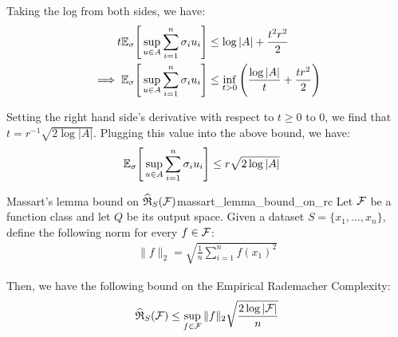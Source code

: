 \begin{proof*}
    \noindent Taking the log from both sides, we have:
    \begin{align*}
        t\mathbb{E}_\sigma\Bigg[ 
            \sup_{u\in A} \sum_{i=1}^n \sigma_i u_i
         \Bigg] &\le \log|A| + \frac{t^2r^2}{2} \\
        \implies \mathbb{E}_\sigma\Bigg[ 
            \sup_{u\in A} \sum_{i=1}^n \sigma_i u_i
         \Bigg] &\le \inf_{t>0} \Bigg( 
            \frac{\log|A|}{t} + \frac{tr^2}{2}
         \Bigg)
    \end{align*}

    \noindent Setting the right hand side's derivative with respect to $t\ge0$ to $0$, we find that $t = r^{-1}\sqrt{2\log|A|}$. Plugging this value into the above bound, we have:
    \begin{align*}
        \mathbb{E}_\sigma\Bigg[ 
            \sup_{u\in A} \sum_{i=1}^n \sigma_i u_i
         \Bigg] &\le r\sqrt{2\log|A|}
    \end{align*}
\end{proof*}

\begin{corollary}{Massart's lemma bound on $\widehat{\mathfrak{R}}_S(\mathcal{F})$}{massart_lemma_bound_on_rc}
    Let $\mathcal{F}$ be a function class and let $Q$ be its output space. Given a dataset $S=\{x_1, \dots, x_n\}$, define the following norm for every $f\in\mathcal{F}$:
    \begin{align*}
        \|f\|_2 = \sqrt{
            \frac{1}{n}\sum_{i=1}^n f(x_1)^2
        }
    \end{align*}

    \noindent Then, we have the following bound on the Empirical Rademacher Complexity:
    \begin{align*}
        \widehat{\mathfrak{R}}_S(\mathcal{F}) \le \sup_{f\in\mathcal{F}}\|f\|_2 \sqrt{
            \frac{2\log|\mathcal{F}|}{n}
        }
    \end{align*}
\end{corollary}

